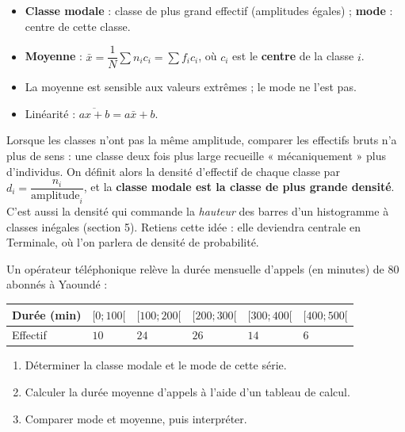 \documentclass[11pt]{article}
\newcommand{\cle}[1]{{\popxbold\color{popdark}#1}}
\begin{document}
\begin{aretenir}
\begin{itemize}
\item \textbf{Classe modale} : classe de plus grand effectif (amplitudes égales) ; \textbf{mode} : centre de cette classe.
\item \textbf{Moyenne} : $\bar{x} = \dfrac{1}{N}\sum n_i c_i = \sum f_i c_i$, où $c_i$ est le \textbf{centre} de la classe $i$.
\item La moyenne est sensible aux valeurs extrêmes ; le mode ne l'est pas.
\item Linéarité : $\overline{ax+b} = a\bar{x} + b$.
\end{itemize}
\end{aretenir}

\begin{savaistu}
Lorsque les classes n'ont pas la même amplitude, comparer les effectifs bruts n'a plus de sens : une classe deux fois plus large recueille « mécaniquement » plus d'individus. On définit alors la \cle{densité d'effectif} de chaque classe par $d_i = \dfrac{n_i}{\text{amplitude}_i}$, et la \textbf{classe modale est la classe de plus grande densité}. C'est aussi la densité qui commande la \emph{hauteur} des barres d'un histogramme à classes inégales (section 5). Retiens cette idée : elle deviendra centrale en Terminale, où l'on parlera de densité de probabilité.
\end{savaistu}

\begin{exercice}
Un opérateur téléphonique relève la durée mensuelle d'appels (en minutes) de $80$ abonnés à Yaoundé :
\begin{center}
\begin{tabularx}{\linewidth}{|l|X|X|X|X|X|}
\hline
\rowcolor{popblueL} Durée (min) & $[0;100[$ & $[100;200[$ & $[200;300[$ & $[300;400[$ & $[400;500[$ \\
\hline
Effectif & $10$ & $24$ & $26$ & $14$ & $6$ \\
\hline
\end{tabularx}
\end{center}
\begin{enumerate}
\item Déterminer la classe modale et le mode de cette série.
\item Calculer la durée moyenne d'appels à l'aide d'un tableau de calcul.
\item Comparer mode et moyenne, puis interpréter.
\end{enumerate}
\end{exercice}
\end{document}
